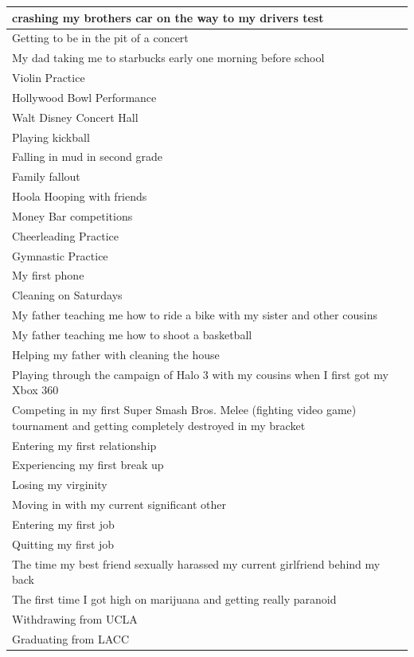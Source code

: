 \documentclass[
  .7em,
  letterpaper,
  DIV=11,
  numbers=noendperiod]{scrartcl}
\begin{document}
\begin{table}
\begin{tabular}{l}
\hline
crashing my brothers car on the way to my drivers test\\
\hline
Getting to be in the pit of a concert\\
\hline
My dad taking me to starbucks early one morning before school\\
\hline
Violin Practice\\
\hline
Hollywood Bowl Performance\\
\hline
Walt Disney Concert Hall\\
\hline
Playing kickball\\
\hline
Falling in mud in second grade\\
\hline
Family fallout\\
\hline
Hoola Hooping with friends\\
\hline
Money Bar competitions\\
\hline
Cheerleading Practice\\
\hline
Gymnastic Practice\\
\hline
My first phone\\
\hline
Cleaning on Saturdays\\
\hline
My father teaching me how to ride a bike with my sister and other cousins\\
\hline
My father teaching me how to shoot a basketball\\
\hline
Helping my father with cleaning the house\\
\hline
Playing through the campaign of Halo 3 with my cousins when I first got my Xbox 360\\
\hline
Competing in my first Super Smash Bros. Melee (fighting video game) tournament and getting completely destroyed in my bracket\\
\hline
Entering my first relationship\\
\hline
Experiencing my first break up\\
\hline
Losing my virginity\\
\hline
Moving in with my current significant other\\
\hline
Entering my first job\\
\hline
Quitting my first job\\
\hline
The time my best friend sexually harassed my current girlfriend behind my back\\
\hline
The first time I got high on marijuana and getting really paranoid\\
\hline
Withdrawing from UCLA\\
\hline
Graduating from LACC\\

\end{tabular}
\end{table}
\end{document}
